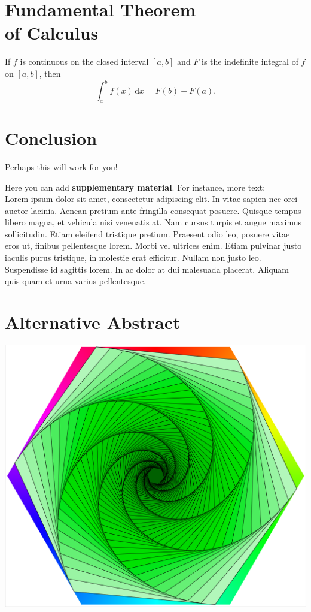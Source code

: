 \documentclass[a0paper,fleqn]{betterposter}
\begin{document}
{\section{Fundamental Theorem\\of Calculus}
If $f$ is continuous on the closed interval $[a,b]$ and $F$ is the indefinite integral of $f$ on $[a,b]$, then
\begin{equation}
\int_a^b f(x)\,\mathrm{d}x = F(b)-F(a).
\end{equation}

\section{Conclusion}
Perhaps this will work for you!



}{

Here you can add \textbf{supplementary material}. For instance, more text:\\
Lorem ipsum dolor sit amet, consectetur adipiscing elit. In vitae sapien nec orci auctor lacinia. Aenean pretium ante fringilla consequat posuere. Quisque tempus libero magna, et vehicula nisi venenatis at. Nam cursus turpis et augue maximus sollicitudin. Etiam eleifend tristique pretium. Praesent odio leo, posuere vitae eros ut, finibus pellentesque lorem. Morbi vel ultrices enim. Etiam pulvinar justo iaculis purus tristique, in molestie erat efficitur. Nullam non justo leo. Suspendisse id sagittis lorem. In ac dolor at dui malesuada placerat. Aliquam quis quam et urna varius pellentesque.



\section{Alternative Abstract}
\begin{center}
\includegraphics[width=\textwidth]{images/tyre.png}
\end{center}

}
\end{document}
